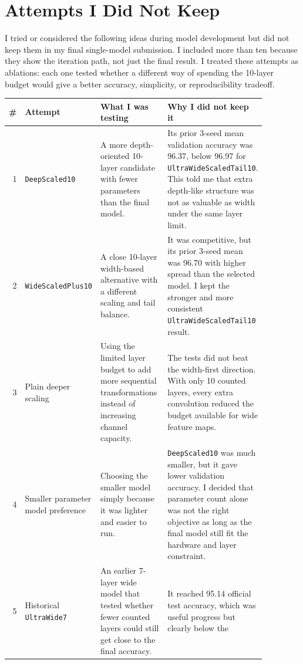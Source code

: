 \documentclass[11pt]{article}
\begin{document}
\section{Attempts I Did Not Keep}

I tried or considered the following ideas during model development but did not
keep them in my final single-model submission. I included more than ten because they show the
iteration path, not just the final result. I treated these attempts as ablations: each
one tested whether a different way of spending the 10-layer budget would give a better
accuracy, simplicity, or reproducibility tradeoff.

\begingroup
\small
\renewcommand{\arraystretch}{1.15}
\begin{longtable}{r p{0.20\linewidth} p{0.32\linewidth} p{0.35\linewidth}}
\toprule
\textbf{\#} & \textbf{Attempt} & \textbf{What I was testing} &
\textbf{Why I did not keep it} \\
\midrule
\endhead
1 & \texttt{DeepScaled10} &
A more depth-oriented 10-layer candidate with fewer parameters than the final model. &
Its prior 3-seed mean validation accuracy was 96.37, below 96.97 for
\texttt{UltraWideScaledTail10}. This told me that extra depth-like structure was not as
valuable as width under the same layer limit. \\
2 & \texttt{WideScaledPlus10} &
A close 10-layer width-based alternative with a different scaling and tail balance. &
It was competitive, but its prior 3-seed mean was 96.70 with higher spread than the
selected model. I kept the stronger and more consistent \texttt{UltraWideScaledTail10}
result. \\
3 & Plain deeper scaling &
Using the limited layer budget to add more sequential transformations instead of
increasing channel capacity. &
The tests did not beat the width-first direction. With only 10 counted layers, every
extra convolution reduced the budget available for wide feature maps. \\
4 & Smaller parameter model preference &
Choosing the smaller model simply because it was lighter and easier to run. &
\texttt{DeepScaled10} was much smaller, but it gave lower validation accuracy. I decided
that parameter count alone was not the right objective as long as the final model still
fit the hardware and layer constraint. \\
5 & Historical \texttt{UltraWide7} &
An earlier 7-layer wide model that tested whether fewer counted layers could still get
close to the final accuracy. &
It reached 95.14 official test accuracy, which was useful progress but clearly below the

\end{longtable}
\end{document}
